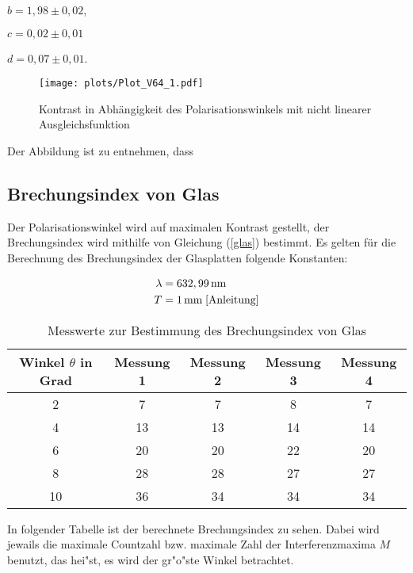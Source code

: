 \begin{center}
$b= 1,98 \pm 0,02 $,
\end{center}

\begin{center}
$c=  0,02 \pm 0,01 $
\end{center}
\begin{center}
$d= 0,07 \pm 0,01 $.
\end{center}

\begin{figure}
  \centering
  \texttt{[image: plots/Plot\_V64\_1.pdf]}
  \caption{Kontrast in Abhängigkeit des Polarisationswinkels mit nicht linearer Ausgleichsfunktion}
  \label{fig:plot1}
\end{figure}
Der Abbildung ist zu entnehmen, dass

 \subsection{Brechungsindex von Glas}
 Der Polarisationswinkel wird auf maximalen Kontrast gestellt, der Brechungsindex wird mithilfe von Gleichung (\ref{glas}) bestimmt.
Es gelten für die Berechnung des Brechungsindex der Glasplatten folgende Konstanten:

 \begin{align*}
  \lambda &= 632,99\, \text{nm} \\
  T &= 1 \, \text{mm} \; \text{\cite{Anleitung}}
 \end{align*}



  \begin{table}
 \centering
 \begin{tabular}{c|c|c|c|c}

Winkel $\theta$ in Grad	&	Messung 1	&	Messung 2	& Messung 3 & Messung 4 \\

 \hline
2	&	7	&	7	& 	8	&	7 \\
4	&	13	&	13	& 	14	&	14 \\
6	&	20	&	20	& 	22	& 	20 \\
8	&	28	&	28	&	27 	& 	27  \\
10	&	36	&	34	&	34 	& 	34 \\
   \end{tabular}
 \caption{Messwerte zur Bestimmung des Brechungsindex von Glas}
 \end{table}

In folgender Tabelle ist der berechnete Brechungsindex zu sehen. Dabei wird jewails die maximale Countzahl bzw. maximale Zahl der Interferenzmaxima $M$ benutzt, das hei"st, es wird der gr"o"ste Winkel betrachtet.

